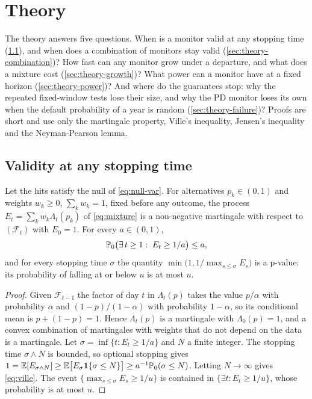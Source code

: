 \section{Theory}
\label{sec:theory}

The theory answers five questions. When is a monitor valid at any stopping time (\cref{sec:theory-validity}), and when does a combination of monitors stay valid (\cref{sec:theory-combination})? How fast can any monitor grow
under a departure, and what does a mixture cost (\cref{sec:theory-growth})? What power can a monitor have at a fixed horizon (\cref{sec:theory-power})? And where do the guarantees stop: why the repeated fixed-window tests
lose their size, and why the PD monitor loses its own when the default probability of a year is random (\cref{sec:theory-failure})? Proofs are short and use only the martingale property, Ville's inequality, Jensen's inequality and
the Neyman-Pearson lemma.

\subsection{Validity at any stopping time}
\label{sec:theory-validity}

\begin{proposition}
\label{prop:validity}
Let the hits satisfy the null of \cref{eq:null-var}. For alternatives $p_k\in(0,1)$ and weights $w_k\ge0$, $\sum_kw_k=1$, fixed before any outcome, the process $E_t=\sum_kw_k\Lambda_t(p_k)$ of \cref{eq:mixture} is a non-negative martingale with respect to $(\mathcal F_t)$ with $E_0=1$.
For every $a\in(0,1)$,
\begin{equation}
\mathbb{P}_0\bigl(\exists\,t\ge1:\;E_t\ge 1/a\bigr)\le a ,
\label{eq:ville}
\end{equation}
and for every stopping time $\sigma$ the quantity $\min\bigl(1,1/\max_{s\le\sigma}E_s\bigr)$ is a p-value: its probability of falling at or below $u$ is at most $u$.
\end{proposition}
\begin{proof}
Given $\mathcal F_{t-1}$ the factor of day $t$ in $\Lambda_t(p)$ takes the value $p/\alpha$ with probability $\alpha$ and $(1-p)/(1-\alpha)$ with probability $1-\alpha$, so its conditional mean is $p+(1-p)=1$. Hence $\Lambda_t(p)$ is a
martingale with $\Lambda_0(p)=1$, and a convex combination of martingales with weights that do not depend on the data is a martingale. Let $\sigma=\inf\{t:E_t\ge1/a\}$ and $N$ a finite integer. The stopping time $\sigma\wedge N$ is bounded, so optional stopping gives
$1=\mathbb{E}[E_{\sigma\wedge N}]\ge\mathbb{E}\bigl[E_\sigma\mathbf{1}\{\sigma\le N\}\bigr]\ge a^{-1}\mathbb{P}_0(\sigma\le N)$. Letting $N\to\infty$ gives \cref{eq:ville}. The event $\{\max_{s\le\sigma}E_s\ge1/u\}$ is contained in $\{\exists t:E_t\ge1/u\}$, whose probability is at most $u$.
\end{proof}

